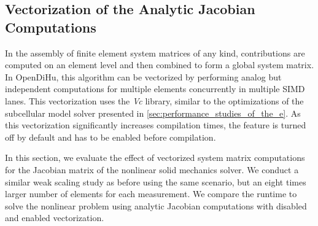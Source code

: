 

\subsection{Vectorization of the Analytic Jacobian Computations}\label{sec:vectorization_analytic_jacobian}

In the assembly of finite element system matrices of any kind, contributions are computed on an element level and then combined to form a global system matrix. In OpenDiHu, this algorithm can be vectorized by performing analog but independent computations for multiple elements concurrently in multiple SIMD lanes. This vectorization uses the \emph{Vc} library, similar to the optimizations of the subcellular model solver presented in \cref{sec:performance_studies_of_the_e}. As this vectorization significantly increases compilation times, the feature is turned off by default and has to be enabled before compilation.

In this section, we evaluate the effect of vectorized system matrix computations for the Jacobian matrix of the nonlinear solid mechanics solver. We conduct a similar weak scaling study as before using the same scenario, but an eight times larger number of elements for each measurement. We compare the runtime to solve the nonlinear problem using analytic Jacobian computations with disabled and enabled vectorization.

